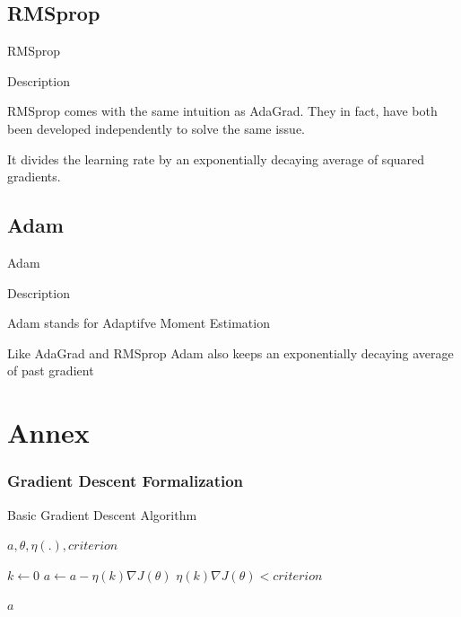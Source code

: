 \documentclass{beamer}
\begin{document}
\subsection{RMSprop}

\begin{frame}{RMSprop}
\begin{block}{Description}

RMSprop comes with the same intuition as AdaGrad. They in fact, have both been developed independently to solve the same issue.

It divides the learning rate by an exponentially decaying average of squared gradients.

\end{block}

\end{frame}


\subsection{Adam}

\begin{frame}{Adam}
\begin{block}{Description}

Adam stands for Adaptifve Moment Estimation

Like AdaGrad and RMSprop Adam also keeps an exponentially decaying average of past gradient

\end{block}

\end{frame}



\section{Annex}

\begin{frame}
\frametitle{Gradient Descent Formalization}

\begin{block}{Basic Gradient Descent Algorithm}
\begin{algorithmic}
\Require $ a, \theta, \eta(.), criterion$

\State $ k \gets 0$
\Repeat
	\State $a \gets a - \eta(k) \nabla J(\theta) $
\Until  $\eta(k) \nabla J(\theta) < criterion$

\Ensure $a$
\end{algorithmic}

\end{block}
\end{frame}
\end{document}

